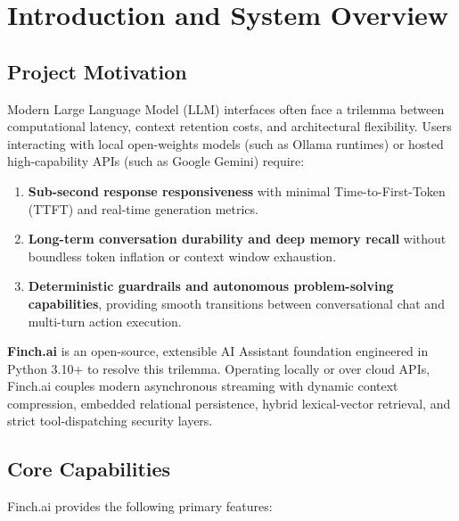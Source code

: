\chapter{Introduction and System Overview}
\label{chap:introduction}

\section{Project Motivation}
Modern Large Language Model (LLM) interfaces often face a trilemma between computational latency, context retention costs, and architectural flexibility. Users interacting with local open-weights models (such as Ollama runtimes) or hosted high-capability APIs (such as Google Gemini) require:
\begin{enumerate}
    \item \textbf{Sub-second response responsiveness} with minimal Time-to-First-Token (TTFT) and real-time generation metrics.
    \item \textbf{Long-term conversation durability and deep memory recall} without boundless token inflation or context window exhaustion.
    \item \textbf{Deterministic guardrails and autonomous problem-solving capabilities}, providing smooth transitions between conversational chat and multi-turn action execution.
\end{enumerate}

\textbf{Finch.ai} is an open-source, extensible AI Assistant foundation engineered in Python 3.10+ to resolve this trilemma. Operating locally or over cloud APIs, Finch.ai couples modern asynchronous streaming with dynamic context compression, embedded relational persistence, hybrid lexical-vector retrieval, and strict tool-dispatching security layers.

\section{Core Capabilities}
Finch.ai provides the following primary features:

